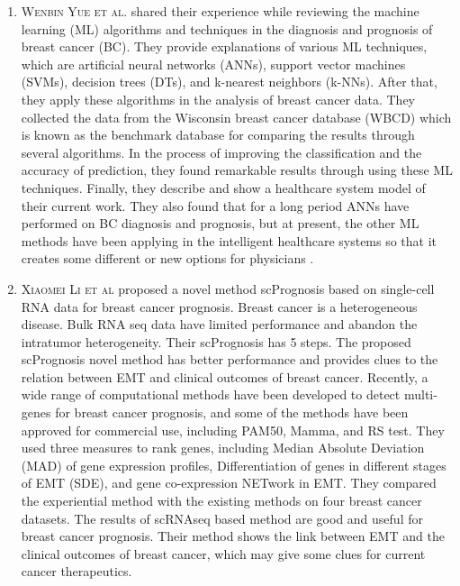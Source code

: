 \begin{enumerate}
    \item \textsc{Wenbin Yue et al.} shared their experience while reviewing the machine learning (ML) algorithms  and techniques in the diagnosis and prognosis of breast cancer (BC). They provide explanations of various ML techniques, which are artificial neural networks (ANNs), support vector machines (SVMs), decision trees (DTs), and k-nearest neighbors (k-NNs). After that, they apply these algorithms in the analysis of breast cancer data. They collected the data from the Wisconsin breast cancer database (WBCD) which is known as the benchmark database for comparing the results through several algorithms. In the process of improving the classification and the accuracy of prediction, they found remarkable results through using these ML techniques. Finally, they describe and show a healthcare system model of their current work.  They also found that for a long period ANNs have performed on BC diagnosis and prognosis, but at present, the other ML methods have been applying in the intelligent healthcare systems so that it creates some different or new options for physicians \cite{designs2020013}.
    
    \item \textsc{Xiaomei Li et al} proposed a novel method scPrognosis based on single-cell RNA data for breast cancer prognosis. Breast cancer is a heterogeneous disease. Bulk RNA seq data have limited performance and abandon the intratumor heterogeneity. Their scPrognosis has 5 steps. The proposed scPrognosis novel method has better performance and provides clues to the relation between EMT and clinical outcomes of breast cancer. Recently, a wide range of computational methods have been developed to detect multi-genes for breast cancer prognosis, and some of the methods have been approved for commercial use, including PAM50, Mamma, and RS test. They used three measures to rank genes, including Median Absolute Deviation (MAD) of gene expression profiles, Differentiation of genes in different stages of EMT (SDE), and gene co-expression NETwork in EMT. They compared the experiential method with the existing methods on four breast cancer datasets. The results of scRNAseq based method are good and useful for breast cancer prognosis. Their method shows the link between EMT and the clinical outcomes of breast cancer, which may give some clues for current cancer therapeutics.\cite{10.1371/journal.pcbi.1008133}



\end{enumerate}
